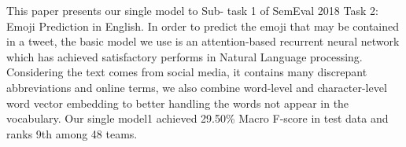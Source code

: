 This paper presents our single model to Sub- task 1 of SemEval 2018 Task 2: Emoji Prediction in English. In order to predict the emoji that may be contained in a tweet, the basic model we use is an attention-based recurrent neural network which has achieved satisfactory performs in Natural Language processing. Considering the text comes from social media, it contains many discrepant abbreviations and online terms, we also combine word-level and character-level word vector embedding to better handling the words not appear in the vocabulary. Our single model1 achieved 29.50\% Macro F-score in test data and ranks 9th among 48 teams.
